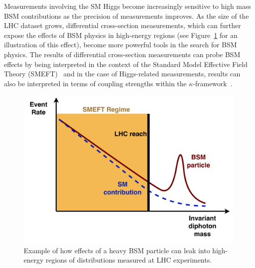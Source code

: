 \documentclass[letter, USenglish, 11pt, subfigure]{article}
\begin{document}
Measurements involving the SM Higgs become increasingly sensitive to high mass BSM contributions as the precision of measurements improves. As the size of the LHC dataset grows, differential cross-section measurements, which can further expose the effects of BSM physics in high-energy regions (see Figure~\ref{fig:SMEFT_highmass} for an illustration of this effect), become more powerful tools in the search for BSM physics.
The results of differential cross-section measurements can probe BSM effects by being interpreted in the context of the Standard Model Effective Field Theory (SMEFT)~\cite{Buchmuller:1985jz,Grzadkowski:2010es,SMEFTsim3} and in the case of Higgs-related measurements, results can also be interpreted in terms of coupling strengths within the $\kappa$-framework~\cite{deFlorian:2016spz}.
\begin{figure}
  \centering
  \includegraphics[width=\linewidth]{figures/SMEFT.pdf}
  \caption{\label{fig:SMEFT_highmass} Example of how effects of a heavy BSM particle can leak into high-energy regions of distributions measured at LHC experiments.}
\end{figure}
\end{document}
